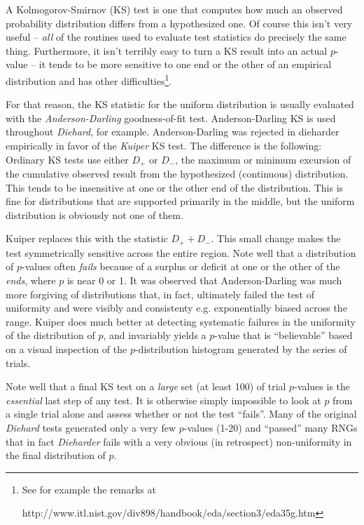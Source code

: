 \documentclass[12pt]{article}
\begin{document}
A Kolmogorov-Smirnov (KS) test is one that computes how much an observed
probability distribution differs from a hypothesized one.  Of course
this isn't very useful -- {\em all} of the routines used to evaluate
test statistics do precisely the same thing.  Furthermore, it isn't
terribly easy to turn a KS result into an actual $p$-value -- it tends
to be more sensitive to one end or the other of an empirical
distribution and has other difficulties\footnote{See for example the
remarks  at \\
\centerline{
 {http://www.itl.nist.gov/div898/handbook/eda/section3/eda35g.htm}}}.

For that reason, the KS statistic for the uniform distribution is
usually evaluated with the {\em Anderson-Darling} goodness-of-fit test.
Anderson-Darling KS is used throughout {\em Diehard}, for example.
Anderson-Darling was rejected in dieharder empirically in favor of the
{\em Kuiper} KS test.  The difference is the following:  Ordinary KS
tests use either $D_+$ or $D_-$, the maximum or minimum excursion of the
cumulative observed result from the hypothesized (continuous)
distribution.  This tends to be insensitive at one or the other end of
the distribution.  This is fine for distributions that are supported
primarily in the middle, but the uniform distribution is obviously not
one of them.

Kuiper replaces this with the statistic $D_+ + D_-$.  This small change
makes the test symmetrically sensitive across the entire region.  Note
well that a distribution of $p$-values often {\em fails} because of a
surplus or deficit at one or the other of the {\em ends}, where $p$ is
near 0 or 1.  It was observed that Anderson-Darling was much more
forgiving of distributions that, in fact, ultimately failed the test of
uniformity and were visibly and consistenty e.g. exponentially biased
across the range.  Kuiper does much better at detecting systematic
failures in the uniformity of the distribution of $p$, and invariably
yields a $p$-value that is ``believable'' based on a visual inspection
of the $p$-distribution histogram generated by the series of trials.

Note well that a final KS test on a {\em large} set (at least 100) of
trial $p$-values is the {\em essential} last step of any test.  It is
otherwise simply impossible to look at $p$ from a single trial alone and
assess whether or not the test ``fails''.  Many of the original {\em
Diehard} tests generated only a very few $p$-values (1-20) and
``passed'' many RNGs that in fact {\em Dieharder} fails with a very
obvious (in retrospect) non-uniformity in the final distribution of $p$.
\end{document}
